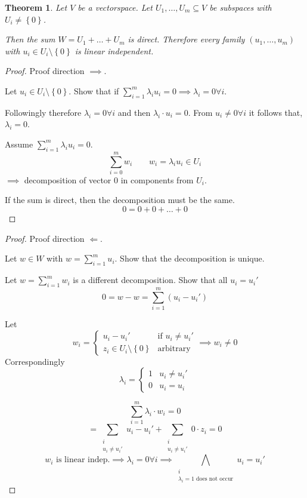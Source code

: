 \documentclass[a4paper,landscape,twocolumn]{article}
\newcommand\set[1]{\left\{#1\right\}}
\newtheorem{theorem}{Theorem}[section]
\begin{document}
\begin{theorem}
  \label{satz-4-14}
  Let $V$ be a vectorspace. Let $U_1, \dots, U_m \subseteq V$ be subspaces
  with $U_i \neq \set{0}$.

  Then the sum $W = U_1 + \dots + U_m$ is direct.
  Therefore every family $(u_1, \dots, u_m)$ with $u_i \in U_i \setminus \set{0}$ is linear independent.
\end{theorem}
\begin{proof}
  Proof direction $\implies$.

  Let $u_i \in U_i \setminus \set{0}$.
  Show that if $\sum_{i=1}^m \lambda_i u_i = 0 \implies \lambda_i = 0 \forall i$.

  Followingly therefore $\lambda_i = 0 \forall i$ and then $\lambda_i \cdot u_i = 0$.
  From $u_i \neq 0 \forall i$ it follows that, $\lambda_i = 0$.

  Assume $\sum_{i=1}^m \lambda_i u_i = 0$.
  \[ \sum_{i=0}^m w_i \qquad w_i = \lambda_i u_i \in U_i \]
  $\implies$ decomposition of vector $0$ in components from $U_i$.

  If the sum is direct, then the decomposition must be the same.
  \[ 0 = 0 + 0 + \dots + 0 \]
\end{proof}
\begin{proof}
  Proof direction $\Leftarrow$.

  Let $w \in W$ with $w = \sum_{i = 1}^m u_i$.
  Show that the decomposition is unique.

  Let $w = \sum_{i=1}^m w_i$ is a different decomposition.
  Show that all $u_i = u_i'$
  \[ 0 = w - w = \sum_{i=1}^m (u_i - u_i') \]

  Let
  \[
    w_i = \begin{cases}
      u_i - u_i' & \text{if } u_i \neq u_i' \\
      z_i \in U_i \setminus \set{0} & \text{arbitrary}
    \end{cases}
    \implies w_i \neq 0
  \]
  Correspondingly
  \[
    \lambda_i = \begin{cases}
      1 & u_i \neq u_i' \\
      0 & u_i = u_i
    \end{cases}
  \]

  \[ \sum_{i=1}^m \lambda_i \cdot w_i = 0 \]
  \[ = \sum_{\substack{i \\ u_i \neq u_i'}} u_i - u_i' + \sum_{\substack{i \\ u_i \neq u_i'}} 0 \cdot z_i = 0 \]
  \[ w_i \text{ is linear indep.} \implies \lambda_i = 0 \forall i \implies \bigwedge_{\substack{i \\ \lambda_i = 1 \text{ does not occur}}} u_i = u_i' \]
\end{proof}
\end{document}
